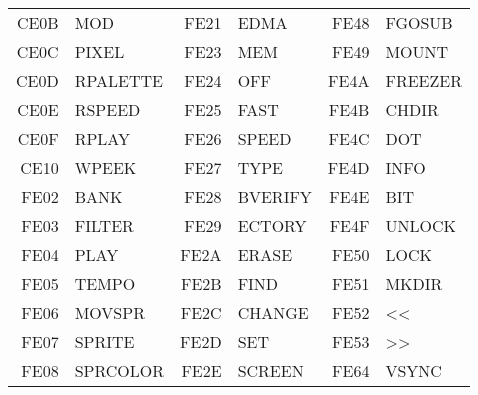 {\begin{center}
\begin{tabular}{|rp{2.2cm}|rp{2.2cm}|rp{2.2cm}|}
CE0B & MOD        &FE21 & EDMA       &FE48 & FGOSUB     \\
CE0C & PIXEL      &FE23 & MEM        &FE49 & MOUNT      \\
CE0D & RPALETTE   &FE24 & OFF        &FE4A & FREEZER    \\
CE0E & RSPEED     &FE25 & FAST       &FE4B & CHDIR      \\
CE0F & RPLAY      &FE26 & SPEED      &FE4C & DOT        \\
CE10 & WPEEK      &FE27 & TYPE       &FE4D & INFO       \\
FE02 & BANK       &FE28 & BVERIFY    &FE4E & BIT        \\
FE03 & FILTER     &FE29 & ECTORY     &FE4F & UNLOCK     \\
FE04 & PLAY       &FE2A & ERASE      &FE50 & LOCK       \\
FE05 & TEMPO      &FE2B & FIND       &FE51 & MKDIR      \\
FE06 & MOVSPR     &FE2C & CHANGE     &FE52 & <<         \\
FE07 & SPRITE     &FE2D & SET        &FE53 & >>         \\
FE08 & SPRCOLOR   &FE2E & SCREEN     &FE64 & VSYNC      \\
\hline
\end{tabular}
\end{center}
}
